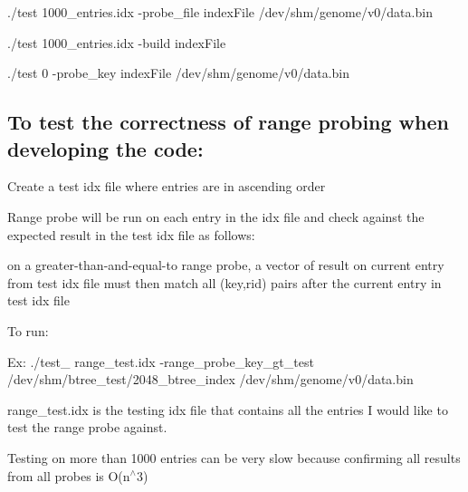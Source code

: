 
\begin{DoxyItemize}
\item ./test 1000\+\_\+entries.\+idx -\/probe\+\_\+file index\+File /dev/shm/genome/v0/data.bin
\item ./test 1000\+\_\+entries.\+idx -\/build index\+File
\item ./test 0 -\/probe\+\_\+key index\+File /dev/shm/genome/v0/data.bin
\end{DoxyItemize}

\subsection*{To test the correctness of range probing when developing the code\+:}


\begin{DoxyItemize}
\item Create a test idx file where entries are in ascending order
\item Range probe will be run on each entry in the idx file and check against the expected result in the test idx file as follows\+:
\begin{DoxyItemize}
\item on a greater-\/than-\/and-\/equal-\/to range probe, a vector of result on current entry from test idx file must then match all (key,rid) pairs after the current entry in test idx file
\end{DoxyItemize}
\item To run\+:
\begin{DoxyItemize}
\item Ex\+: ./test\+\_ range\+\_\+test.\+idx -\/range\+\_\+probe\+\_\+key\+\_\+gt\+\_\+test /dev/shm/btree\+\_\+test/2048\+\_\+btree\+\_\+index /dev/shm/genome/v0/data.bin
\item range\+\_\+test.\+idx is the testing idx file that contains all the entries I would like to test the range probe against.
\end{DoxyItemize}
\item Testing on more than 1000 entries can be very slow because confirming all results from all probes is O(n$^\wedge$3) 
\end{DoxyItemize}